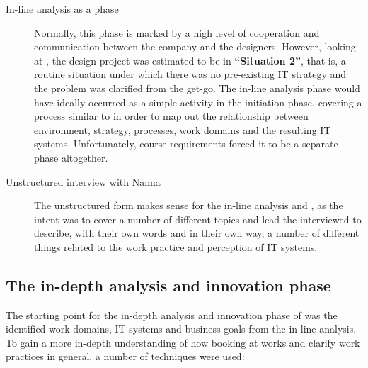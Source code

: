 \begin{description}
    \item [In-line analysis as a phase] Normally, this phase is marked by a
        high level of cooperation and communication between the company and the
        designers\cite{bodker2004participatory}. However, looking at
        \cite[p.120, Figure 5.1]{bodker2004participatory}, the \gomonkey{}
        design project was estimated to be in \textbf{``Situation 2''}, that is,
        a routine situation under which there was no pre-existing IT strategy
        and the problem was clarified from the get-go. The in-line analysis
        phase would have ideally occurred as a simple activity in the initiation
        phase, covering a process similar to \cite[p.131, Figure
        5.3]{bodker2004participatory} in order to map out the relationship
        between environment, strategy, processes, work domains and the resulting
        IT systems. Unfortunately, course requirements forced it to be a separate phase
        altogether. 
    \item [Unstructured interview with Nanna] The unstructured form makes sense for the
        in-line analysis and \gomonkey{}, as the intent was to cover a number of
        different topics and lead the interviewed to describe, with their own
        words and in their own way, a number of different things related to the
        work practice and perception of IT systems.
\end{description}

\subsection{The in-depth analysis and innovation phase}
The starting point for the in-depth analysis and innovation phase of \gomonkey{} 
was the identified work domains, IT systems and business goals from the in-line analysis. 
To gain a more in-depth understanding of how booking at \gomonkey{} works and clarify work
practices in general, a number of techniques were used:


